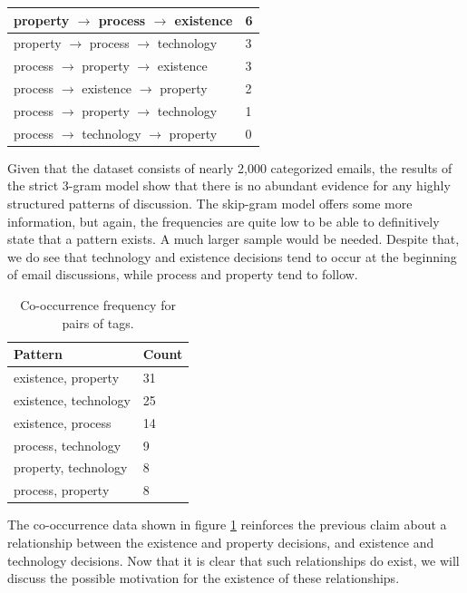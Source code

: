 \documentclass[a4paper, 12pt]{article}
\begin{document}
\begin{table}[H]
\begin{tabular}{|l|l|}
				property    $ \rightarrow $ process     $ \rightarrow $ existence   & 6 \\ \hline
				property    $ \rightarrow $ process     $ \rightarrow $ technology  & 3 \\ \hline
				process     $ \rightarrow $ property    $ \rightarrow $ existence   & 3 \\ \hline
				process     $ \rightarrow $ existence   $ \rightarrow $ property    & 2 \\ \hline
				process     $ \rightarrow $ property    $ \rightarrow $ technology  & 1 \\ \hline
				process     $ \rightarrow $ technology  $ \rightarrow $ property    & 0 \\ \hline
			\end{tabular}
		\end{table}
	
		Given that the dataset consists of nearly 2,000 categorized emails, the results of the strict 3-gram model show that there is no abundant evidence for any highly structured patterns of discussion. The skip-gram model offers some more information, but again, the frequencies are quite low to be able to definitively state that a pattern exists. A much larger sample would be needed. Despite that, we do see that technology and existence decisions tend to occur at the beginning of email discussions, while process and property tend to follow.
	
		\begin{table}[H]
			\centering
			\caption{Co-occurrence frequency for pairs of tags.}
			\begin{tabular}{|l|l|}
				\hline
				\textbf{Pattern} & \textbf{Count} \\ \hline
				existence, property & 31 \\ \hline
				existence, technology & 25 \\ \hline
				existence, process & 14 \\ \hline
				process, technology & 9 \\ \hline
				property, technology & 8 \\ \hline
				process, property & 8 \\ \hline
			\end{tabular}
			\label{fig:2co-occurrence}
		\end{table}
	
		The co-occurrence data shown in figure \ref{fig:2co-occurrence} reinforces the previous claim about a relationship between the existence and property decisions, and existence and technology decisions. Now that it is clear that such relationships do exist, we will discuss the possible motivation for the existence of these relationships.
		
\end{document}
